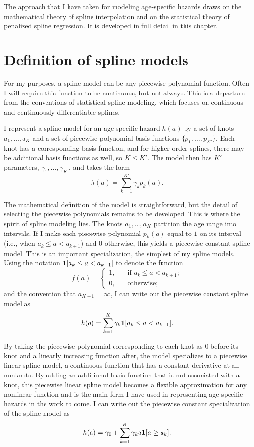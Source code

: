 The approach that I have taken for modeling age-specific hazards draws
on the mathematical theory of spline interpolation and on the
statistical theory of penalized spline regression.  It is developed in
full detail in this chapter.


\section{Definition of spline models}
\label{spline_models}
For my purposes, a spline model can be any piecewise polynomial
function.  Often I will require this function to be continuous, but
not always.  This is a departure from the conventions of statistical
spline modeling, which focuses on continuous and continuously
differentiable splines.\cite{hastie_elements_2009,wahba_spline_1990}

I represent a spline model for an age-specific hazard $h(a)$ by a set
of knots $a_1,\dots,a_{K}$ and a set of piecewise polynomial basis
functions $\{p_1,\ldots,p_{K'}\}$.  Each knot has a corresponding
basis function, and for higher-order splines, there may be additional
basis functions as well, so $K \leq K'$.  The model then has $K'$
parameters, $\gamma_1,\ldots,\gamma_{K'}$, and takes the form
\[
h(a) = \sum_{k=1}^{K'} \gamma_k p_k(a).
\]

The mathematical definition of the model is straightforward, but the
detail of selecting the piecewise polynomials remains to be developed.
This is where the spirit of spline modeling lies. The knots $a_1,
\dots, a_{K}$ partition the age range into intervals. If I make each
piecewise polynomial $p_k(a)$ equal to $1$ on its interval (i.e., when
$a_k \leq a < a_{k+1}$) and $0$ otherwise, this yields a piecewise
constant spline model.  This is an important specialization, the
simplest of my spline models.  Using the notation $\mathbf{1}[a_k \leq a <
  a_{k+1}]$ to denote the function
\[f(a)
= \begin{cases}1,&\quad\text{if }a_k \leq a <
  a_{k+1};\\0,&\quad\text{otherwise;}\end{cases}
\]
 and the convention
that $a_{K+1} = \infty$, I can write out the piecewise constant spline
model as
\[
h(a) = \sum_{k=1}^K \gamma_k \mathbf{1}[a_k \leq a < a_{k+1}].
\]

By taking the piecewise polynomial corresponding to each knot as $0$
before its knot and a linearly increasing function after, the model
specializes to a piecewise linear spline model, a continuous
function that has a constant derivative at all nonknots.  By adding
an additional basis function that is not associated with a knot, this
piecewise linear spline model becomes a flexible approximation for any
nonlinear function and is the main form I have used in representing
age-specific hazards in the work to come.  I can write out the
piecewise constant specialization of the spline model as
\[
h(a) = \gamma_0 + \sum_{k=1}^K \gamma_k a \mathbf{1}[a \geq a_k].
\]

